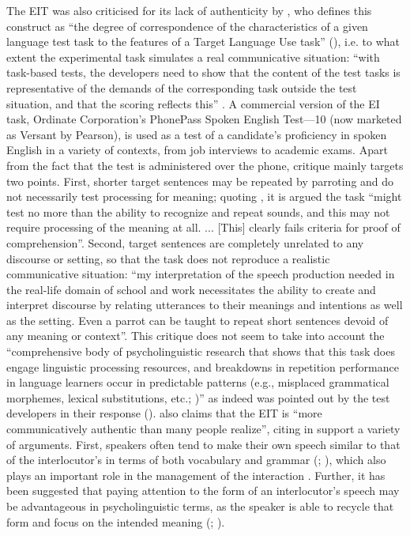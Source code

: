 The EIT was also criticised for its lack of authenticity by \citet{Chun2006}, who defines this construct as “the degree of correspondence of the characteristics of a given language test task to the features of a Target Language Use task” (\citealt[23]{BachmanPalmer2009}), i.e. to what extent the experimental task simulates a real communicative situation: “with task-based tests, the developers need to show that the content of the test tasks is representative of the demands of the corresponding task outside the test situation, and that the scoring reflects this” \citep[43]{Luoma2004}. A commercial version of the EI task, Ordinate Corporation’s PhonePass Spoken English Test—10 (now marketed as Versant by Pearson), is used as a test of a candidate’s proficiency in spoken English in a variety of contexts, from job interviews to academic exams. Apart from the fact that the test is administered over the phone,  critique mainly targets two points. First, shorter target sentences may be repeated by parroting and do not necessarily test processing for meaning; quoting \citet[79]{Buck2001}, it is argued the task “might test no more than the ability to recognize and repeat sounds, and this may not require processing of the meaning at all. ... [This] clearly fails  criteria for proof of comprehension”. Second, target sentences are completely unrelated to any discourse or setting, so that the task does not reproduce a realistic communicative situation: “my interpretation of the speech production needed in the real-life domain of school and work necessitates the ability to create and interpret discourse by relating utterances to their meanings and intentions as well as the setting. Even a parrot can be taught to repeat short sentences devoid of any meaning or context”. This critique does not seem to take into account the “comprehensive body of psycholinguistic research that shows that this task does engage linguistic processing resources, and breakdowns in repetition performance in language learners occur in predictable patterns (e.g., misplaced grammatical morphemes, lexical substitutions, etc.; \citealt{EllisEtAl2006, Radloff1991})” as indeed was pointed out by the test developers in their response (\citealt[163--164]{DowneyEtAl2008}). \citet[330]{Van-Moere2012} also claims that the EIT is “more communicatively authentic than many people realize”, citing in support a variety of arguments. First, speakers often tend to make their own speech similar to that of the interlocutor’s in terms of both vocabulary and grammar (\citealt[313]{Levinson1983}; \citealt[89]{BrownYule1983}), which also plays an important role in the management of the interaction \citep[52]{Tannen2007}. Further, it has been suggested that paying attention to the form of an interlocutor’s speech may be advantageous in psycholinguistic terms, as the speaker is able to recycle that form and focus on the intended meaning (\citealt{Swain1985}; \citealt{BygateEtAl2001}).

